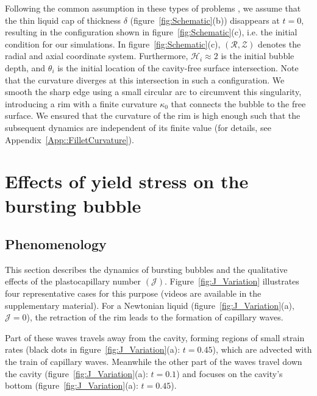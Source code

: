 \documentclass[final]{jfm}
\begin{document}
Following the common assumption in these types of problems \citep{deike2018dynamics, gordillo2019capillary}, we assume that the thin liquid cap of thickness $\delta$ (figure~\ref{fig:Schematic}(b)) disappears at $t = 0$, resulting in the configuration shown in figure~\ref{fig:Schematic}(c), i.e. the initial condition for our simulations. In figure~\ref{fig:Schematic}(c), $\left(\mathcal{R}, \mathcal{Z}\right)$ denotes the radial and axial coordinate system. Furthermore, $\mathcal{H}_i \approx 2$ is the initial bubble depth, and $\theta_i$ is the initial location of the cavity-free surface intersection. Note that the curvature diverges at this intersection in such a configuration. We smooth the sharp edge using a small circular arc to circumvent this singularity, introducing a rim with a finite curvature $\kappa_0$ that connects the bubble to the free surface. We ensured that the curvature of the rim is high enough such that the subsequent dynamics are independent of its finite value (for details, see Appendix~\ref{App::FilletCurvature}).

\section{Effects of yield stress on the bursting bubble}\label{Sec::Phenomenological}
\subsection{Phenomenology}\label{Sec::Phenomenological1}
This section describes the dynamics of bursting bubbles and the qualitative effects of the plastocapillary number $\left(\mathcal{J}\right)$. Figure~\ref{fig:J_Variation} illustrates four representative cases for this purpose (videos are available in the supplementary material). For a Newtonian liquid (figure~\ref{fig:J_Variation}(a), $\mathcal{J} = 0$), the retraction of the rim leads to the formation of capillary waves. 


Part of these waves travels away from the cavity, forming regions of small strain rates (black dots in figure~\ref{fig:J_Variation}(a): $t = 0.45$), which are advected with the train of capillary waves. 
Meanwhile the other part of the waves travel down the cavity (figure~\ref{fig:J_Variation}(a): $t = 0.1$) and focuses on the cavity's bottom (figure~\ref{fig:J_Variation}(a): $t = 0.45$). 
\end{document}
